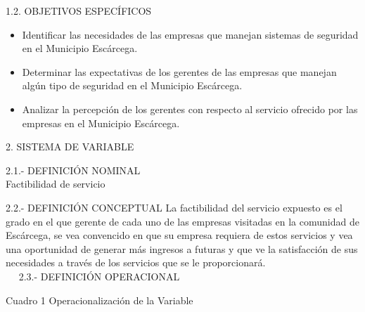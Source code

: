 \documentclass[12pt] {report}
\begin{document}
1.2. OBJETIVOS ESPECÍFICOS
\begin{itemize}
\item Identificar las necesidades de las empresas que manejan sistemas de seguridad en el Municipio Escárcega.
\item Determinar las expectativas de los gerentes de las empresas que manejan algún tipo de seguridad en el Municipio Escárcega.
\item Analizar la percepción de los gerentes con respecto al servicio ofrecido por las empresas en el Municipio Escárcega.
\end{itemize}

2. SISTEMA DE VARIABLE

2.1.- DEFINICIÓN NOMINAL
\\
Factibilidad  de servicio

2.2.- DEFINICIÓN CONCEPTUAL
La factibilidad del servicio expuesto  es el grado en el que gerente de cada uno de las empresas visitadas en la comunidad de Escárcega, se vea convencido en que su empresa requiera de estos servicios y vea una oportunidad de generar más ingresos a futuras y que ve la satisfacción de sus necesidades a través de los servicios que se le proporcionará. \\

 
2.3.- DEFINICIÓN OPERACIONAL

Cuadro 1
Operacionalización de la Variable
\end{document}
